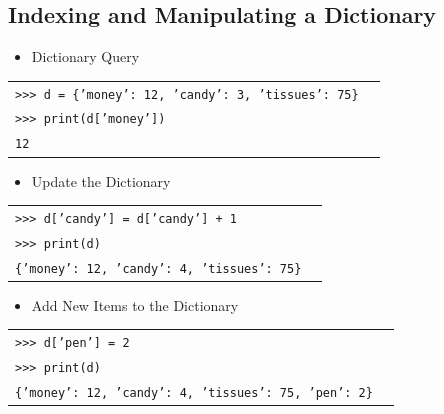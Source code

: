 \documentclass[t,handout,9pt]{beamer}
\begin{document}
\subsection{Indexing and Manipulating a Dictionary}
\begin{frame}
\vfill
\begin{itemize}
	\item Dictionary Query
\end{itemize}
\begin{table}[]
\begin{flushleft}
\begin{tabular}{ll}
\texttt{>{}>{}> d = \{'money': 12, 'candy': 3, 'tissues': 75\}} &  \\
\texttt{>{}>{}> print(d['money'])} & \\
\texttt{12} &  \\
\end{tabular}
\end{flushleft}
\end{table}
\begin{itemize}
	\item Update the Dictionary
\end{itemize}
\begin{table}[]
\begin{flushleft}
\begin{tabular}{ll}
\texttt{>{}>{}> d['candy'] = d['candy'] + 1} &  \\
\texttt{>{}>{}> print(d)} & \\
\texttt{\{'money': 12, 'candy': 4, 'tissues': 75\}} &  \\
\end{tabular}
\end{flushleft}
\end{table}
\vfill
\begin{itemize}
	\item Add New Items to the Dictionary
\end{itemize}
\begin{table}[]
\begin{flushleft}
\begin{tabular}{ll}
\texttt{>{}>{}> d['pen'] = 2} &  \\
\texttt{>{}>{}> print(d)} & \\
\texttt{\{'money': 12, 'candy': 4, 'tissues': 75, 'pen': 2\}} &  \\
\end{tabular}
\end{flushleft}
\end{table}
\vfill

\end{frame}
\end{document}

